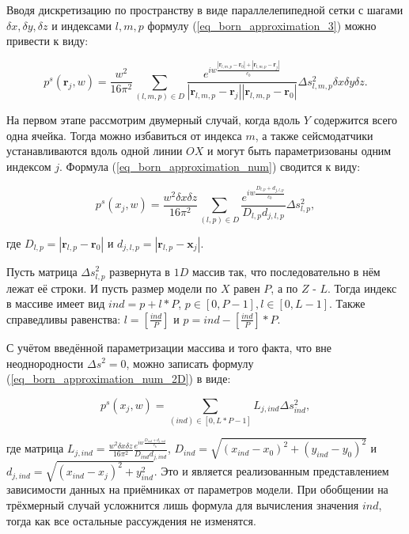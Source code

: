 \documentclass{article}
\renewcommand{\vec     } [1]     { \bm{#1}           }
\begin{document}
Вводя дискретизацию по пространству в виде параллелепипедной сетки с шагами $\delta x, \delta y, \delta z$ и индексами $l, m, p$ формулу (\ref{eq_born_approximation_3}) можно
привести к виду:

\begin{equation}
\label{eq_born_approximation_num}
p^s(\vec{r}_j, w) = \frac{w^2}{16\pi^2} \sum_{(l,m,p)\in D} \frac{e^{iw\frac{|\vec{r}_{l,m,p}-\vec{r}_0| + |\vec{r}_{l,m,p}-\vec{r}_j|}{c_b}}}{|\vec{r}_{l,m,p}-\vec{r}_j||\vec{r}_{l,m,p}-\vec{r}_0|} \Delta s_{l,m,p}^2 \delta x \delta y \delta z.
\end{equation}

На первом этапе рассмотрим двумерный случай, когда вдоль $Y$ содержится всего одна ячейка.
Тогда можно избавиться от индекса $m$, а также сейсмодатчики устанавливаются вдоль одной линии $OX$ и могут быть параметризованы одним индексом $j$.
Формула (\ref{eq_born_approximation_num}) сводится к виду:

\begin{equation}
\label{eq_born_approximation_num_2D}
p^s(x_j, w) = \frac{w^2 \delta x \delta z}{16\pi^2} \sum_{(l,p)\in D} \frac{e^{iw\frac{D_{l,p}+d_{j,l,p}}{c_b}}}{D_{l,p}d_{j,l,p}} \Delta s_{l,p}^2,
\end{equation}

где $D_{l,p}=|\vec{r}_{l,p}-\vec{r}_0|$ и $d_{j,l,p}=|\vec{r}_{l,p}-\vec{x}_j|$.

Пусть матрица $\Delta s_{l,p}^2$ развернута в $1D$ массив так, что последовательно в нём лежат её строки.
И пусть размер модели по $X$ равен $P$, а по $Z$ - $L$.
Тогда индекс в массиве имеет вид $ind = p + l * P$, $p \in [0, P - 1], l \in [0, L - 1]$.
Также справедливы равенства: $l = [\frac{ind}{P}]$ и $p = ind - [\frac{ind}{P}] * P$.

С учётом введённой параметризации массива и того факта, что вне неоднородности $\Delta s^2 = 0$, можно записать формулу (\ref{eq_born_approximation_num_2D}) в виде:

\begin{equation}
\label{eq_born_approximation_num_2D_ind}
p^s(x_j, w) = \sum_{(ind)\in [0, L * P - 1]} L_{j,ind} \Delta s_{ind}^2,
\end{equation}

где матрица $L_{j,ind} = \frac{w^2 \delta x \delta z}{16\pi^2} \frac{e^{iw\frac{D_{ind}+d_{j,ind}}{c_b}}}{D_{ind}d_{j,ind}}$,
$D_{ind}=\sqrt{(x_{ind} - x_0)^2 + (y_{ind} - y_0)^2}$ и $d_{j,ind}=\sqrt{(x_{ind} - x_j)^2 + y_{ind}^2}$.
Это и является реализованным представлением зависимости данных на приёмниках от параметров модели.
При обобщении на трёхмерный случай усложнится лишь формула для вычисления значения $ind$, тогда как все остальные рассуждения не изменятся.



\end{document}

